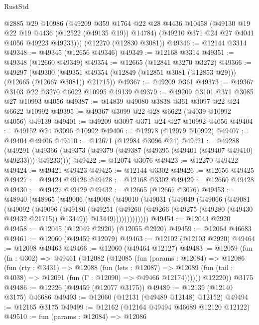\begin{lexlean}{RustStd}
\begin{coremodule}
      @2885
      @29
      @10986
      (@49209
        @359
        @1764
        @22
        @28
        @4436
        @10458
        (@49130 @19 @22 @19 @4436 (@12522 (@49135 @19)) @14784)
        (@49210 @371 @24 @27 @4041 @4056 @49223 @49233)))
    (@12270 (@12830 @3081))
@49346 := @12144 @3314
@49348 := @49345 (@12656 @49346)
@49349 := @12168 @3314
@49351 := @49348 (@12660 @49349)
@49354 := @12665 (@12841 @3270 @3272)
@49366 := @49297
    (@49300 (@49351 @49354 (@12849 (@12851 @3081 (@12853 @29))) (@12665 (@12667 @3081)) @21715))
@49367 := @49209 @361
@49373 := @49367 @3103 @22 @3270 @6622 @10995 @49139
@49379 := @49209 @3101 @371 @3085 @27 @10993 @4056
@49387 := @14839 @49080 @3838 @361 @3097 @22 @24 @6622 @10992
@49395 := @49367 @3099 @22 @28 @6622 (@4039 @10992 @4056) @49139
@49401 := @49209 @3097 @371 @24 @27 @10992 @4056
@49404 := @49152 @24 @3096 @10992
@49406 := @12978 (@12979 @10992)
@49407 := @49404 @49406
@49410 := @12671 (@12984 @3096 @24)
@49421 := @49288
    (@49291 (@49366 (@49373 (@49379 (@49387 (@49395 (@49401 (@49407 @49410) @49233))) @49233))))
@49422 := @12074 @3076
@49423 := @12270 @49422
@49424 := @49421 @49423
@49425 := @12144 @3302
@49426 := @12656 @49425
@49427 := @49424 @49426
@49428 := @12168 @3302
@49429 := @12660 @49428
@49430 := @49427 @49429
@49432 := @12665 (@12667 @3076)
@49453 := @48940
    (@48965
      (@49006
        (@49008
          (@49010
            (@49031
              (@49049
                (@49066
                  (@49081
                    (@49092
                      (@49096
                        (@49180
                          (@49251
                            (@49260
                              (@49266 (@49275 (@49280 (@49430 @49432 @21715)) @13449))
                              @13449)))))))))))))
@49454 := @12043 @2920
@49458 := @12045 (@12049 @2920) (@12055 @2920)
@49459 := @12064 @46683
@49461 := @12060 (@49459 @12079)
@49463 := @12102 (@12103 @2920)
@49464 := @12098 @49463
@49466 := @12060 (@49464 @12127)
@49483 := @12059
    (fun (fn : @302) =>
    @49461
      (@12082
        (@12085
          (fun (params : @12084) =>
          @12086
            (fun (rty : @3431) =>
            @12088
              (fun (lets : @12087) =>
              @12089 (fun (tail : @4038) => @12091 (fun (Γ : @12090) => @49466 @12174))))))
        @12220))
    @3175
@49486 := @12226 (@49459 (@12077 @3175))
@49489 := @12139 (@12140 @3175) @46686
@49493 := @12060 (@12131 (@49489 @12148) @12152)
@49494 := @12165 @3175
@49499 := @12162 (@12164 @49494 @46689 @12120 @12122)
@49510 := fun (params : @12084) =>
  @12086

\end{coremodule}
\end{lexlean}
